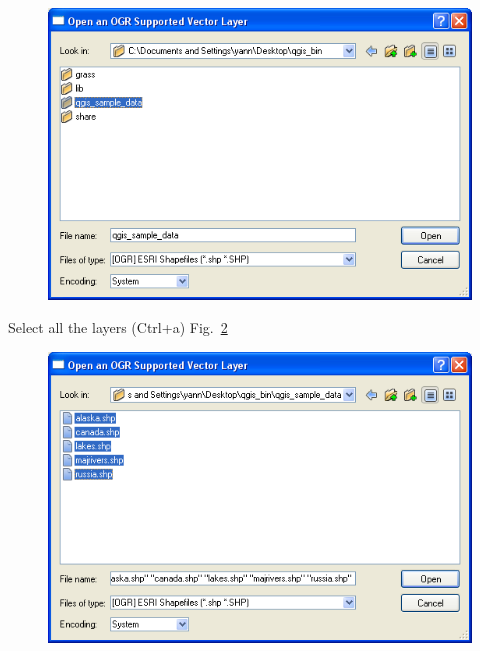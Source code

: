 \begin{figure}[htbp]
   \centering
   \includegraphics[scale=0.35]{qgis001.png}
   \caption{}
   \label{fig:qgis001}
\end{figure}

Select all the layers (Ctrl+a) Fig.~\ref{fig:qgis002}

\begin{figure}[htbp]
   \centering
   \includegraphics[scale=0.35]{qgis002.png}
   \caption{}
   \label{fig:qgis002}
\end{figure}

